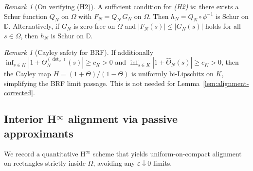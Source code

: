 \documentclass[11pt]{article}
\theoremstyle{definition}
\theoremstyle{remark}
\newtheorem{remark}[theorem]{Remark}
\begin{document}
\begin{remark}[On verifying (H2)]
A sufficient condition for \emph{(H2)} is: there exists a Schur function \(Q_N\) on \(\Omega\) with \(F_N=Q_N\,G_N\) on \(\Omega\). Then \(h_N=Q_N\circ\phi^{-1}\) is Schur on \(\mathbb D\). Alternatively, if \(G_N\) is zero-free on \(\Omega\) and \(|F_N(s)|\le |G_N(s)|\) holds for all \(s\in\Omega\), then \(h_N\) is Schur on \(\mathbb D\).
\end{remark}

\begin{remark}[Cayley safety for BRF]
If additionally \(\inf_{s\in K}|1+\Theta^{(\operatorname{det}_2)}_N(s)|\ge c_K>0\) and \(\inf_{s\in K}|1+\widehat{\Theta}_N(s)|\ge c_K>0\), then the Cayley map \(H=(1+\Theta)/(1-\Theta)\) is uniformly bi-Lipschitz on \(K\), simplifying the BRF limit passage. This is not needed for Lemma~\ref{lem:alignment-corrected}.
\end{remark}

\subsection{Interior H$^\infty$ alignment via passive approximants}\label{subsec:hinf-passive}
We record a quantitative H$^\infty$ scheme that yields uniform-on-compact alignment on rectangles strictly inside \(\Omega\), avoiding any \(\varepsilon\downarrow 0\) limits.
\end{document}
